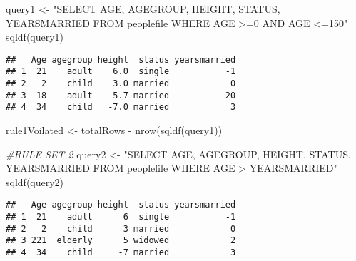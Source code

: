 \documentclass[
]{article}
\newenvironment{Shaded}{\begin{snugshade}}{\end{snugshade}}
\newcommand{\CommentTok}[1]{\textcolor[rgb]{0.56,0.35,0.01}{\textit{#1}}}
\newcommand{\FunctionTok}[1]{\textcolor[rgb]{0.00,0.00,0.00}{#1}}
\newcommand{\NormalTok}[1]{#1}
\newcommand{\OtherTok}[1]{\textcolor[rgb]{0.56,0.35,0.01}{#1}}
\newcommand{\SpecialCharTok}[1]{\textcolor[rgb]{0.00,0.00,0.00}{#1}}
\newcommand{\StringTok}[1]{\textcolor[rgb]{0.31,0.60,0.02}{#1}}
\begin{document}
\begin{Shaded}
\begin{Highlighting}[]
\NormalTok{query1 }\OtherTok{\textless{}{-}} \StringTok{"SELECT}
\StringTok{                            AGE,}
\StringTok{                            AGEGROUP,}
\StringTok{                            HEIGHT,}
\StringTok{                            STATUS,}
\StringTok{                            YEARSMARRIED}
\StringTok{                        FROM}
\StringTok{                            peoplefile}
\StringTok{                        WHERE}
\StringTok{                            AGE \textgreater{}=0 AND AGE \textless{}=150"}
\FunctionTok{sqldf}\NormalTok{(query1)}
\end{Highlighting}
\end{Shaded}

\begin{verbatim}
##   Age agegroup height  status yearsmarried
## 1  21    adult    6.0  single           -1
## 2   2    child    3.0 married            0
## 3  18    adult    5.7 married           20
## 4  34    child   -7.0 married            3
\end{verbatim}

\begin{Shaded}
\begin{Highlighting}[]
\NormalTok{rule1Voilated }\OtherTok{\textless{}{-}}\NormalTok{ totalRows }\SpecialCharTok{{-}} \FunctionTok{nrow}\NormalTok{(}\FunctionTok{sqldf}\NormalTok{(query1))}
\end{Highlighting}
\end{Shaded}

\begin{Shaded}
\begin{Highlighting}[]
\CommentTok{\#RULE SET 2}
\NormalTok{query2 }\OtherTok{\textless{}{-}} \StringTok{"SELECT}
\StringTok{                    AGE,}
\StringTok{                    AGEGROUP,}
\StringTok{                    HEIGHT,}
\StringTok{                    STATUS,}
\StringTok{                    YEARSMARRIED}
\StringTok{                FROM}
\StringTok{                    peoplefile}
\StringTok{                WHERE}
\StringTok{                    AGE \textgreater{} YEARSMARRIED"}
\FunctionTok{sqldf}\NormalTok{(query2)}
\end{Highlighting}
\end{Shaded}

\begin{verbatim}
##   Age agegroup height  status yearsmarried
## 1  21    adult      6  single           -1
## 2   2    child      3 married            0
## 3 221  elderly      5 widowed            2
## 4  34    child     -7 married            3
\end{verbatim}
\end{document}
